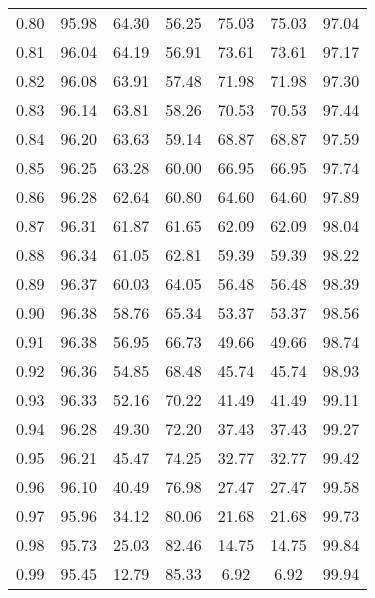 \begin{tabular}{|c|c|c|c|c|c|c|}
      0.80 &     95.98 &     64.30 &      56.25 &   75.03 &      75.03 &         97.04 \\
      0.81 &     96.04 &     64.19 &      56.91 &   73.61 &      73.61 &         97.17 \\
      0.82 &     96.08 &     63.91 &      57.48 &   71.98 &      71.98 &         97.30 \\
      0.83 &     96.14 &     63.81 &      58.26 &   70.53 &      70.53 &         97.44 \\
      0.84 &     96.20 &     63.63 &      59.14 &   68.87 &      68.87 &         97.59 \\
      0.85 &     96.25 &     63.28 &      60.00 &   66.95 &      66.95 &         97.74 \\
      0.86 &     96.28 &     62.64 &      60.80 &   64.60 &      64.60 &         97.89 \\
      0.87 &     96.31 &     61.87 &      61.65 &   62.09 &      62.09 &         98.04 \\
      0.88 &     96.34 &     61.05 &      62.81 &   59.39 &      59.39 &         98.22 \\
      0.89 &     96.37 &     60.03 &      64.05 &   56.48 &      56.48 &         98.39 \\
      0.90 &     96.38 &     58.76 &      65.34 &   53.37 &      53.37 &         98.56 \\
      0.91 &     96.38 &     56.95 &      66.73 &   49.66 &      49.66 &         98.74 \\
      0.92 &     96.36 &     54.85 &      68.48 &   45.74 &      45.74 &         98.93 \\
      0.93 &     96.33 &     52.16 &      70.22 &   41.49 &      41.49 &         99.11 \\
      0.94 &     96.28 &     49.30 &      72.20 &   37.43 &      37.43 &         99.27 \\
      0.95 &     96.21 &     45.47 &      74.25 &   32.77 &      32.77 &         99.42 \\
      0.96 &     96.10 &     40.49 &      76.98 &   27.47 &      27.47 &         99.58 \\
      0.97 &     95.96 &     34.12 &      80.06 &   21.68 &      21.68 &         99.73 \\
      0.98 &     95.73 &     25.03 &      82.46 &   14.75 &      14.75 &         99.84 \\
      0.99 &     95.45 &     12.79 &      85.33 &    6.92 &       6.92 &         99.94 \\
\bottomrule
\end{tabular}
